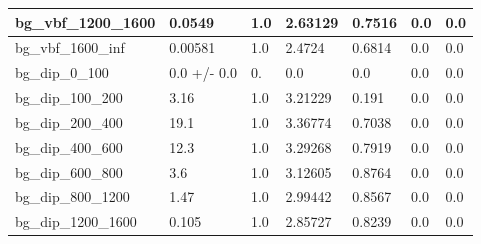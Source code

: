 \documentclass[a4paper, 10pt]{article}
\begin{document}
\begin{table}[H]
\begin{center}
\begin{tabular}{|m{23.0mm}|m{23.0mm}|m{18.0mm}|m{19.0mm}|m{19.0mm}|m{19.0mm}|m{19.0mm}|}
      \hline
      {\cellcolor{white}         bg\_vbf\_1200\_1600}& {\cellcolor{white}         0.0549}& {\cellcolor{white}         1.0}& {\cellcolor{white}         2.63129}& {\cellcolor{white}         0.7516}& {\cellcolor{green}         0.0}& {\cellcolor{green}         0.0}\\
      \hline
      {\cellcolor{white}         bg\_vbf\_1600\_inf}& {\cellcolor{white}         0.00581}& {\cellcolor{white}         1.0}& {\cellcolor{white}         2.4724}& {\cellcolor{white}         0.6814}& {\cellcolor{green}         0.0}& {\cellcolor{green}         0.0}\\
      \hline
      {\cellcolor{white}         bg\_dip\_0\_100}& {\cellcolor{white}         0.0 +/\-- 0.0}& {\cellcolor{white}         0.}& {\cellcolor{white}         0.0}& {\cellcolor{white}         0.0}& {\cellcolor{green}         0.0}& {\cellcolor{green}         0.0}\\
      \hline
      {\cellcolor{white}         bg\_dip\_100\_200}& {\cellcolor{white}         3.16}& {\cellcolor{white}         1.0}& {\cellcolor{white}         3.21229}& {\cellcolor{white}         0.191}& {\cellcolor{green}         0.0}& {\cellcolor{green}         0.0}\\
      \hline
      {\cellcolor{white}         bg\_dip\_200\_400}& {\cellcolor{white}         19.1}& {\cellcolor{white}         1.0}& {\cellcolor{white}         3.36774}& {\cellcolor{white}         0.7038}& {\cellcolor{green}         0.0}& {\cellcolor{green}         0.0}\\
      \hline
      {\cellcolor{white}         bg\_dip\_400\_600}& {\cellcolor{white}         12.3}& {\cellcolor{white}         1.0}& {\cellcolor{white}         3.29268}& {\cellcolor{white}         0.7919}& {\cellcolor{green}         0.0}& {\cellcolor{green}         0.0}\\
      \hline
      {\cellcolor{white}         bg\_dip\_600\_800}& {\cellcolor{white}         3.6}& {\cellcolor{white}         1.0}& {\cellcolor{white}         3.12605}& {\cellcolor{white}         0.8764}& {\cellcolor{green}         0.0}& {\cellcolor{green}         0.0}\\
      \hline
      {\cellcolor{white}         bg\_dip\_800\_1200}& {\cellcolor{white}         1.47}& {\cellcolor{white}         1.0}& {\cellcolor{white}         2.99442}& {\cellcolor{white}         0.8567}& {\cellcolor{green}         0.0}& {\cellcolor{green}         0.0}\\
      \hline
      {\cellcolor{white}         bg\_dip\_1200\_1600}& {\cellcolor{white}         0.105}& {\cellcolor{white}         1.0}& {\cellcolor{white}         2.85727}& {\cellcolor{white}         0.8239}& {\cellcolor{green}         0.0}& {\cellcolor{green}         0.0}\\

\end{tabular}
\end{center}
\end{table}
\end{document}
